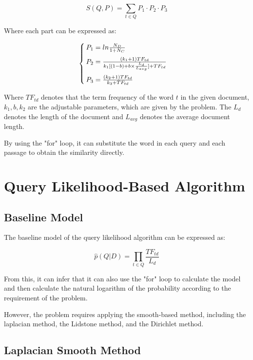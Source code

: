 \documentclass[11pt]{article}
\begin{document}
\begin{equation}
S(Q,P) = \sum_{t\in Q} P_1\cdot P_2\cdot P_3
\end{equation}

Where each part can be expressed as:

\begin{equation}
\begin{cases}
P_1 = ln\frac{N_D}{1 + N_C}\vspace{1.5ex} \\
P_2 = \frac{(k_1 + 1)TF_{td}}{k_1[(1-b) + b\times \frac{L_d}{L_{avg}}] + TF_{td}}\vspace{1.5ex} \\
P_3 = \frac{(k_2 + 1)TF_{td}}{k_3 + TF_{td}}
\end{cases}
\end{equation}

Where $TF_{td}$ denotes that the term frequency of the word $t$ in the given document, $k_1,b,k_2$ are the adjustable parameters, which are given by the problem. The $L_d$ denotes the length of the document and $L_{avg}$ denotes the average document length.

By using the "for" loop, it can substitute the word in each query and each passage to obtain the similarity directly.

\section{Query Likelihood-Based Algorithm}

\subsection{Baseline Model}

The baseline model of the query likelihood algorithm can be expressed as:

\begin{equation}
\hat{p}(Q | D) = \prod_{t\in Q} \frac{TF_{td}}{L_d}
\end{equation}

From this, it can infer that it can also use the "for" loop to calculate the model and then calculate the natural logarithm of the probability according to the requirement of the problem.

However, the problem requires applying the smooth-based method, including the laplacian method, the Lidstone method, and the Dirichlet method.

\subsection{Laplacian Smooth Method}
\end{document}
